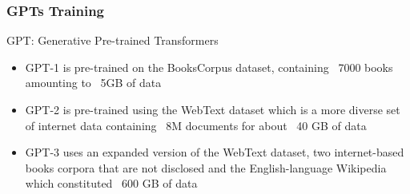 





\begin{frame}[fragile]\frametitle{GPTs Training}

GPT: Generative Pre-trained Transformers

\begin{itemize}
\item GPT-1 is pre-trained on the BooksCorpus dataset, containing ~7000 books amounting to ~5GB of data
\item GPT-2 is pre-trained using the WebText dataset which is a more diverse set of internet data containing ~8M documents for about ~40 GB of data
\item GPT-3 uses an expanded version of the WebText dataset, two internet-based books corpora that are not disclosed and the English-language Wikipedia which constituted ~600 GB of data
\end{itemize}	 

\end{frame}

